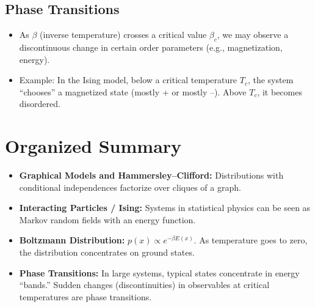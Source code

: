 \documentclass{article}%
\begin{document}
\subsection*{Phase Transitions}
\begin{itemize}
    \item As \(\beta\) (inverse temperature) crosses a critical value \(\beta_c\), we may observe a discontinuous change in certain order parameters (e.g., magnetization, energy).
    \item Example: In the Ising model, below a critical temperature \(T_c\), the system “chooses” a magnetized state (mostly + or mostly --). Above \(T_c\), it becomes disordered.
\end{itemize}

\section{Organized Summary}

\begin{itemize}
    \item \textbf{Graphical Models and Hammersley--Clifford:} Distributions with conditional independences factorize over cliques of a graph.
    \item \textbf{Interacting Particles / Ising:} Systems in statistical physics can be seen as Markov random fields with an energy function.
    \item \textbf{Boltzmann Distribution:} \(p(x)\propto e^{-\beta E(x)}\). As temperature goes to zero, the distribution concentrates on ground states.
    \item \textbf{Phase Transitions:} In large systems, typical states concentrate in energy “bands.” Sudden changes (discontinuities) in observables at critical temperatures are phase transitions.
\end{itemize}
\end{document}
